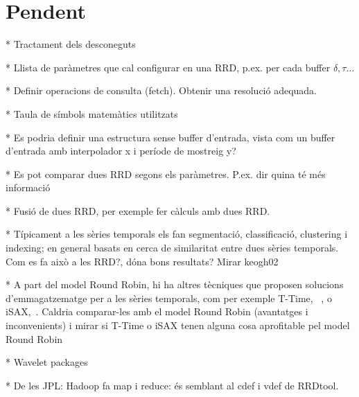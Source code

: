 \section{Pendent}


* Tractament dels desconeguts


* Llista de paràmetres que cal configurar en una RRD, p.ex. per cada buffer $\delta,\tau\ldots$

* Definir operacions de consulta (fetch). Obtenir una resolució adequada.

* Taula de símbols matemàtics utilitzats


* Es podria definir una estructura sense buffer d'entrada, vista com un buffer d'entrada amb interpolador x i període de mostreig y?


* Es pot comparar dues RRD segons els paràmetres. P.ex. dir quina té més informació



* Fusió de dues RRD, per exemple fer càlculs amb dues RRD.

* Típicament a les sèries temporals els fan segmentació, classificació, clustering i indexing; en general basats en cerca de similaritat entre dues sèries temporals. Com es fa això a les RRD?, dóna bons resultats? Mirar keogh02~\cite{keogh02} 

* A part del model Round Robin, hi ha altres tècniques que proposen solucions d'emmagatzematge per a les sèries temporals, com per exemple T-Time, ~\cite{assfalg08:ttime}, o iSAX,~\cite{isax}. Caldria comparar-les amb el model Round Robin (avantatges i inconvenients) i mirar si T-Time o iSAX tenen alguna cosa aprofitable pel model Round Robin

* Wavelet packages

* De les JPL: Hadoop fa map i reduce: és semblant al cdef i vdef de RRDtool.









